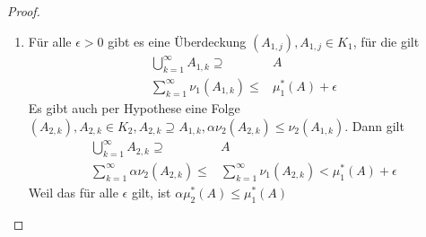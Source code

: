 \documentclass[prb,12pt]{revtex4-2}
\theoremstyle{definition}
\theoremstyle{definition}
\newenvironment{parts}{\begin{enumerate}[label=(\alph*)]}{\end{enumerate}}
\begin{document}
\begin{proof}
	\begin{parts}
	\item F\"{u}r alle $\epsilon>0$ gibt es eine Überdeckung $(A_{1,j}),A_{1,j}\in K_1$, f\"{u}r die gilt
		 \begin{align*}
			 \bigcup_{k=1}^\infty A_{1,k}\supseteq& A\\
			 \sum_{k=1}^{\infty} \nu_1(A_{1,k})\le& \mu_1^*(A)+\epsilon 
		\end{align*}
		Es gibt auch per Hypothese eine Folge $(A_{2,k}), A_{2,k}\in K_2, A_{2,k}\supseteq A_{1,k}, \alpha\nu_2(A_{2,k})\le \nu_2(A_{1,k})$. Dann gilt
		\begin{align*}
			\bigcup_{k=1} ^\infty A_{2,k}\supseteq& A\\
			\sum_{k=1}^{\infty} \alpha\nu_2(A_{2,k})\le& \sum_{k=1}^{\infty} \nu_1(A_{2,k})<\mu_1^*(A)+\epsilon
		\end{align*}
		Weil das f\"{u}r alle $\epsilon$ gilt, ist $\alpha\mu_2^*(A)\le \mu_1^*(A)$
	\end{parts}
\end{proof}
\end{document}
